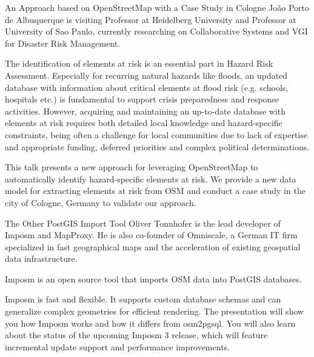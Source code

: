 %
{An Approach based on OpenStreetMap with a Case Study in Cologne}%
{João Porto de Albuquerque is visiting Professor at Heidelberg University and Professor at University of Sao Pau\-lo, currently researching on Collaborative Systems and VGI for Disaster Risk Management. }%
{The identification of elements at risk is an essential part in Hazard Risk Assessment. Especially for recurring natural hazards like floods, an updated database with information about critical elements at flood risk (e.g. schools, hospitals etc.) is fundamental to support crisis preparedness and response activities. However, acquiring and maintaining an up-to-date database with elements at risk requires both detailed local knowledge and hazard-specif\-ic constraints, being often a challenge for local communities due to lack of expertise and appropriate funding, deferred priorities and complex political determinations.

This talk presents a new approach for leveraging OpenStreetMap to automatically identify hazard-specific elements at risk. We provide a new data model for extracting elements at risk from OSM and conduct a case study in the city of Cologne, Germany to validate our approach.}

%
{The Other PostGIS Import Tool}%
{Oliver Tonnhofer is the lead developer of Imposm and MapProxy. He is also co-founder of Omniscale, a German IT firm specialized in fast geographical maps and the acceleration of existing geospatial data infrastructure.}%
{Imposm is an open source tool that imports OSM data into PostGIS databases.

Imposm is fast and flexible. It supports custom data\-base schemas and can generalize complex geometries for efficient rendering.
The presentation will show you how Imposm works and how it differs from osm2pgsql. You will also learn about the status of the upcoming Imposm 3 release, which will feature incremental update support and performance improvements.}

